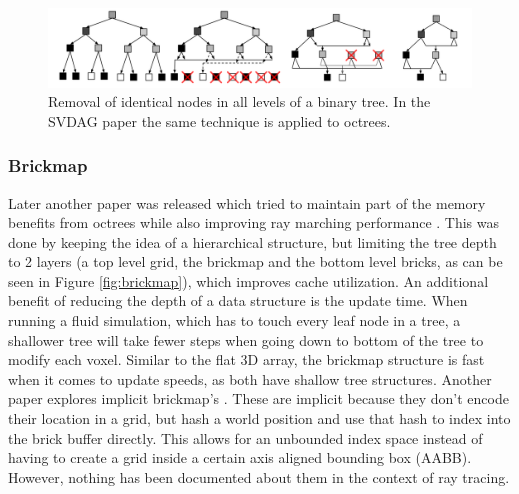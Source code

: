 \begin{figure}
    \centering
    \includegraphics[width=\linewidth]{figures/DAG_node_deduplication.png}
    \caption{Removal of identical nodes in all levels of a binary tree. In the SVDAG paper the same technique is applied to octrees. \cite{kampe2013high}}
    \label{fig:DAG_node_deduplication}
\end{figure}
\subsubsection{Brickmap} \label{related_work:voxel_data_structures:brickmap}
Later another paper was released which tried to maintain part of the memory benefits from octrees while also improving ray marching performance \cite{van2015real}. This was done by keeping the idea of a hierarchical structure, but limiting the tree depth to 2 layers (a top level grid, the brickmap and the bottom level bricks, as can be seen in Figure \ref{fig:brickmap}), which improves cache utilization. An additional benefit of reducing the depth of a data structure is the update time. When running a fluid simulation, which has to touch every leaf node in a tree, a shallower tree will take fewer steps when going down to bottom of the tree to modify each voxel. Similar to the flat 3D array, the brickmap structure is fast when it comes to update speeds, as both have shallow tree structures. Another paper explores implicit brickmap's \cite{niessner2013real}. These are implicit because they don't encode their location in a grid, but hash a world position and use that hash to index into the brick buffer directly. This allows for an unbounded index space instead of having to create a grid inside a certain axis aligned bounding box (AABB). However, nothing has been documented about them in the context of ray tracing.

